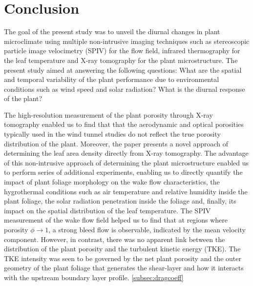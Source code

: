 \section{Conclusion}

The goal of the present study was to unveil the diurnal changes in plant microclimate using multiple non-intrusive imaging techniques such as stereoscopic particle image velocimetry (SPIV) for the flow field, infrared thermography for the leaf temperature and X-ray tomography for the plant microstructure. The present study aimed at answering the following questions: What are the spatial and temporal variability of the plant performance due to environmental conditions such as wind speed and solar radiation? What is the diurnal response of the plant? 

The high-resolution measurement of the plant porosity through X-ray tomography enabled us to find that that the aerodynamic and optical porosities typically used in the wind tunnel studies do not reflect the true porosity distribution of the plant. Moreover, the paper presents a novel approach of determining the leaf area density directly from X-ray tomography. The advantage of this non-intrusive approach of determining the plant microstructure enabled us to perform series of additional experiments, enabling us to directly quantify the impact of plant foliage morphology on the wake flow characteristics, the hygrothermal conditions such as air temperature and relative humidity inside the plant foliage, the solar radiation penetration inside the foliage and, finally, its impact on the spatial distribution of the leaf temperature. The SPIV measurement of the wake flow field helped us to find that at regions where porosity $\phi\rightarrow 1$, a strong bleed flow is observable, indicated by the mean velocity component. However, in contrast, there was no apparent link between the distribution of the plant porosity and the turbulent kinetic energy (TKE). The TKE intensity was seen to be governed by the net plant porosity and the outer geometry of the plant foliage that generates the shear-layer and how it interacts with the upstream boundary layer profile.  \cref{subsec:dragcoeff} 

